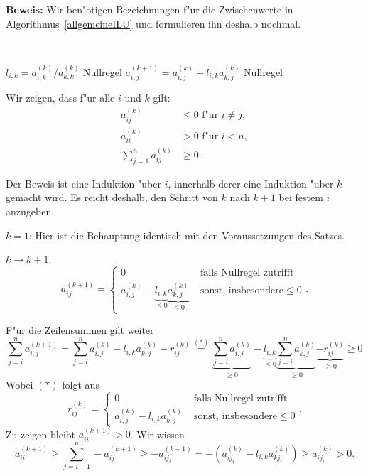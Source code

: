 {\bf Beweis:}
Wir ben"otigen Bezeichnungen f"ur die Zwischenwerte in Algorithmus~\ref{allgemeineILU}
und formulieren ihn deshalb nochmal.

\begin{alg}
~               %
\vspace*{-2\baselineskip}       %
\begin{algorithm}
  \begin{algorithmic}
        \STATE $l_{i,k} = a_{i,k}^{(k)}/a_{k,k}^{(k)}$
        \STATE Nullregel
          \STATE $a_{i,j}^{(k+1)} = a_{i,j}^{(k)} - l_{i,k} a_{k,j}^{(k)}$
        \ENDFOR
      \ENDFOR
    \STATE Nullregel
    \ENDFOR
  \end{algorithmic}
\end{algorithm}
\end{alg}
Wir zeigen, dass f"ur alle $i$ und $k$ gilt:
\begin{align*}
a_{ij}^{(k)} & \leq 0 \text{ f"ur } i\neq j,\\
a_{ii}^{(k)} &  > 0  \text{ f"ur } i < n, \\
\sum_{j=1}^n a_{ij}^{(k)} & \geq 0.
\end{align*}

Der Beweis ist eine Induktion "uber $i$, innerhalb derer eine Induktion
"uber $k$ gemacht wird. Es reicht deshalb, den Schritt von $k$ nach $k+1$
bei festem $i$ anzugeben.

$k = 1$: Hier ist die Behauptung identisch mit den Voraussetzungen des
Satzes.

$k \rightarrow k+1$:
$$
a_{ij}^{(k+1)} =
\begin{cases}
0 & \text{ falls Nullregel zutrifft}\\
a_{i,j}^{(k)} - \underbrace{l_{i,k}}_{\leq 0} \underbrace{a_{k,j}^{(k)}}_{\leq 0} & \text{ sonst, insbesondere} \leq 0
\end{cases} .
$$

F"ur die Zeilensummen gilt weiter
$$\sum_{j=i}^n a_{i,j}^{(k+1)} = \sum_{j=i}^n a_{i,j}^{(k)} - l_{i,k} a_{k,j}^{(k)} - r_{ij}^{(k)}
\overset{(*)}{=} \underbrace{\sum_{j=i}^n a_{i,j}^{(k)}}_{\geq 0} - \underbrace{l_{i,k}}_{\leq 0}
\underbrace{\sum_{j=i}^n a_{k,j}^{(k)}}_{\geq 0} \underbrace{- r_{ij}^{(k)}}_{\geq 0} \geq 0$$
Wobei $(*)$ folgt aus
$$
r_{ij}^{(k)} =
\begin{cases}
0 & \text{ falls Nullregel zutrifft}\\
a_{i,j}^{(k)} - l_{i,k} a_{k,j}^{(k)} & \text{ sonst, insbesondere} \leq 0
\end{cases} .
$$
Zu zeigen bleibt $a_{ii}^{(k+1)} > 0$. Wir wissen 
$$a_{ii}^{(k+1)} \geq \sum_{j=i+1}^n -a_{ij}^{(k+1)} \geq - a_{ij_i}^{(k+1)} = -(a_{ij_i}^{(k)} - l_{i,k} a_{kj_i}^{(k)})
\geq a_{ij_i}^{(k)} > 0.
$$


